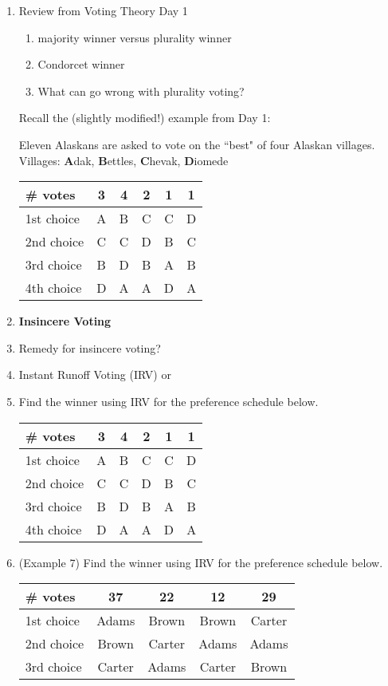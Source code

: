 \documentclass[12pt]{article}
\begin{document}
\begin{enumerate}
\item Review from Voting Theory Day 1\\
	\begin{enumerate}
	\item majority winner versus plurality winner
	\vfill
	\item Condorcet winner
	\vfill
	\item What can go wrong with plurality voting?
	\vfill
	\end{enumerate}
Recall the (slightly modified!) example from Day 1:

Eleven Alaskans are asked to vote on the ``best" of four Alaskan villages.\\

Villages: \textbf{A}dak, \textbf{B}ettles, \textbf{C}hevak, \textbf{D}iomede\\

\begin{tabular}{l || c |c|c|c|c}
\# votes&3&4&2&1&1\\
\hline
1st choice&A&B&C&C&D\\
2nd choice&C&C&D&B&C\\
3rd choice&B&D&B&A&B\\
4th choice&D&A&A&D&A\\
\end{tabular}

\vfill

\item \textbf{Insincere Voting}

\vfill
\item Remedy for insincere voting?
\newpage
\item Instant Runoff Voting (IRV) or 
\vspace{1in}
\item Find the winner using IRV for the preference schedule below.\\
\begin{tabular}{l || c |c|c|c|c}
\# votes&3&4&2&1&1\\
\hline
1st choice&A&B&C&C&D\\
2nd choice&C&C&D&B&C\\
3rd choice&B&D&B&A&B\\
4th choice&D&A&A&D&A\\
\end{tabular}

\vfill

\item (Example 7) Find the winner using IRV for the preference schedule below.\\
\begin{tabular}{l || c |c|c|c|}
\# votes&37&22&12&29\\
\hline
1st choice&Adams&Brown&Brown&Carter\\
2nd choice&Brown&Carter&Adams&Adams\\
3rd choice&Carter&Adams&Carter&Brown\\


\end{tabular}
\end{enumerate}
\end{document}
